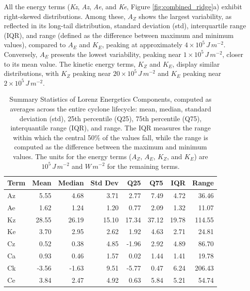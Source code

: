 \documentclass[pdflatex,sn-chicago]{sn-jnl}%
\theoremstyle{plain}
\theoremstyle{definition}
\theoremstyle{remark}
\theoremstyle{definition}
\begin{document}
All the energy terms (\textit{Kz}, \textit{Az}, \textit{Ae}, and \textit{Ke}, Figure \ref{fig:combined_ridge}a) exhibit right-skewed distributions. Among these, $A_Z$ shows the largest variability, as reflected in its long-tail distribution, standard deviation (std), interquartile range (IQR), and range (defined as the difference between maximum and minimum values), compared to $A_E$ and $K_E$, peaking at approximately $4 \times 10^5 \, J \, m^{-2}$. Conversely, $A_E$ presents the lowest variability, peaking near $1 \times 10^5 \, J \, m^{-2}$, closer to its mean value. The kinetic energy terms, $K_Z$ and $K_E$, display similar distributions, with $K_Z$ peaking near $20 \times 10^5 \, J \, m^{-2}$ and $K_E$ peaking near $2 \times 10^5 \, J \, m^{-2}$.


\begin{table}[!htbp]
\centering
\caption[Summary Statistics of Lorenz Energetics Components]{Summary Statistics of Lorenz Energetics Components, computed as averages across the entire cyclone lifecycle: mean, median, standard deviation (std), 25th percentile (Q25), 75th percentile (Q75), interquantile range (IQR), and range. The IQR measures the range within which the central 50\% of the values fall, while the range is computed as the difference between the maximum and minimum values. The units for the energy terms ($A_Z$, $A_E$, $K_Z$, and $K_E$) are $10^5 \, J \, m^{-2}$ and $W \, m^{-2}$ for the remaining terms.}
\label{tab:lec_stats}
\begin{tabular}{lrrrrrrr}
\toprule
Term & Mean & Median & Std Dev & Q25 & Q75 & IQR & Range \\
\midrule
Az & 5.55 & 4.68 & 3.71 & 2.77 & 7.49 & 4.72 & 36.46 \\
Ae & 1.62 & 1.24 & 1.20 & 0.77 & 2.09 & 1.32 & 11.07 \\
Kz & 28.55 & 26.19 & 15.10 & 17.34 & 37.12 & 19.78 & 114.55 \\
Ke & 3.70 & 2.95 & 2.62 & 1.92 & 4.63 & 2.71 & 24.81 \\
Cz & 0.52 & 0.38 & 4.85 & -1.96 & 2.92 & 4.89 & 86.70 \\
Ca & 0.93 & 0.46 & 1.57 & 0.02 & 1.44 & 1.41 & 19.78 \\
Ck & -3.56 & -1.63 & 9.51 & -5.77 & 0.47 & 6.24 & 206.43 \\
Ce & 3.84 & 2.47 & 4.92 & 0.63 & 5.84 & 5.21 & 54.74 \\

\end{tabular}
\end{table}
\end{document}
